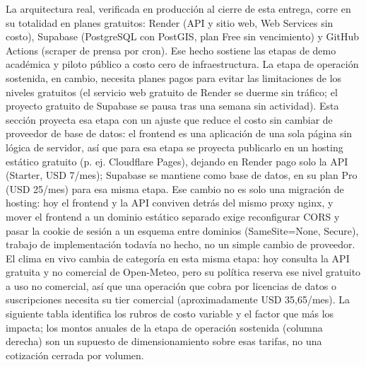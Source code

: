La arquitectura real, verificada en producción al cierre de esta
entrega, corre en su totalidad en planes gratuitos: Render (API y sitio
web, Web Services sin costo), Supabase (PostgreSQL con PostGIS, plan
Free sin vencimiento) y GitHub Actions (scraper de prensa por cron). Ese
hecho sostiene las etapas de demo académica y piloto público a costo
cero de infraestructura. La etapa de operación sostenida, en cambio,
necesita planes pagos para evitar las limitaciones de los niveles
gratuitos (el servicio web gratuito de Render se duerme sin tráfico; el
proyecto gratuito de Supabase se pausa tras una semana sin actividad).
Esta sección proyecta esa etapa con un ajuste que reduce el costo sin
cambiar de proveedor de base de datos: el frontend es una aplicación de
una sola página sin lógica de servidor, así que para esa etapa se
proyecta publicarlo en un hosting estático gratuito (p. ej. Cloudflare
Pages), dejando en Render pago solo la API (Starter, USD 7/mes);
Supabase se mantiene como base de datos, en su plan Pro (USD 25/mes)
para esa misma etapa. Ese cambio no es solo una migración de hosting:
hoy el frontend y la API conviven detrás del mismo proxy nginx, y mover
el frontend a un dominio estático separado exige reconfigurar CORS y
pasar la cookie de sesión a un esquema entre dominios (SameSite=None,
Secure), trabajo de implementación todavía no hecho, no un simple cambio
de proveedor. El clima en vivo cambia de categoría en esta misma etapa:
hoy consulta la API gratuita y no comercial de Open-Meteo, pero su
política reserva ese nivel gratuito a uso no comercial, así que una
operación que cobra por licencias de datos o suscripciones necesita su
tier comercial (aproximadamente USD 35,65/mes). La siguiente tabla
identifica los rubros de costo variable y el factor que más los impacta;
los montos anuales de la etapa de operación sostenida (columna derecha)
son un supuesto de dimensionamiento sobre esas tarifas, no una
cotización cerrada por volumen.

